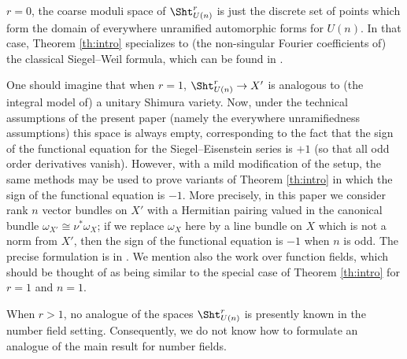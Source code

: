 \begin{remark}
\notreadyWhen $r=0$, the coarse moduli space of $\Sht_{U(n)}^r$ is just the discrete set of points which form the domain of everywhere unramified automorphic forms for $U(n)$. In that case, Theorem \ref{th:intro} specializes to (the non-singular Fourier coefficients of) the classical Siegel--Weil formula, which can be found in \cite{Weil1965}.


One should imagine that when $r=1$, $\Sht_{U(n)}^r \rightarrow X'$ is analogous to (the integral model of) a unitary Shimura variety. Now, under the technical assumptions of the present paper (namely the everywhere unramifiedness assumptions) this space is always empty, corresponding to the fact that the sign of the functional equation for the Siegel--Eisenstein series is $+1$ (so that all odd order derivatives vanish). However, with a mild modification of the setup, the same methods may be used to prove variants of Theorem \ref{th:intro} in which the sign of the functional equation is $-1$. More precisely, in this paper we consider rank $n$ vector bundles on $X'$ with a Hermitian pairing valued in the canonical bundle $\omega_{X'}\cong \nu^* \omega_X$; if we replace $\omega_{X} $ here by a line bundle on $X$ which is not a norm from $X'$, then the sign of the functional equation is $-1$ when $n$ is odd. The precise formulation is in \cite[\S9]{FYZ2}. We mention also the work \cite{Wei19} over function fields, which should be thought of as being similar to the special case of Theorem \ref{th:intro} for $r=1$ and $n=1$.


When $r>1$, no analogue of the spaces $\Sht_{U(n)}^r$ is presently known in the number field setting. Consequently, we do not know how to formulate an analogue of the main result for number fields.

\end{remark}




